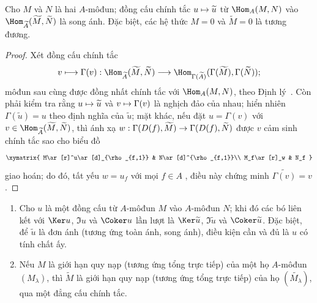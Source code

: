 \documentclass[oneside]{amsart}
\makeatletter
\newcommand{\ega@arrow}[2]{\mathchoice{#1}{#2}{#2}{#2}}
\let\ega@shortmapsto\mapsto
\renewcommand{\to}{\ega@arrow{\longrightarrow}{\rightarrow}}
\renewcommand{\mapsto}{\ega@arrow{\longmapsto}{\ega@shortmapsto}}
\let\EGAOriginalLabel\label
\renewcommand{\label}[1]{\phantomsection\EGAOriginalLabel{#1}}
\makeatother
\begin{document}
\begin{corollary}[1.3.8]
\label{I.1.3.8}
Cho $M$ và $N$ là hai $A$-môđun;
đồng cấu chính tắc $u\mapsto\widetilde{u}$ từ $\Hom_A(M,N)$ vào $\Hom_{\widetilde{A}}(\widetilde{M},\widetilde{N})$ là song ánh.
Đặc biệt, các hệ thức $M=0$ và $\widetilde{M}=0$ là tương đương.
\end{corollary}

\begin{proof}
Xét đồng cấu chính tắc
\[
  v\longmapsto\Gamma(v):
  \Hom_{\widetilde{A}}(\widetilde{M},\widetilde{N})
  \longrightarrow
  \Hom_{\Gamma(\widetilde{A})}(\Gamma(\widetilde{M}),\Gamma(\widetilde{N}));
\]
môđun sau cùng được đồng nhất chính tắc với $\Hom_A(M,N)$, theo Định lý~.
Còn phải kiểm tra rằng $u\mapsto\widetilde{u}$ và $v\mapsto\Gamma(v)$ là nghịch đảo của nhau;
hiển nhiên $\Gamma(\widetilde{u})=u$ theo định nghĩa của $\widetilde{u}$;
mặt khác, nếu đặt $u=\Gamma(v)$ với $v\in\Hom_{\widetilde{A}}(\widetilde{M},\widetilde{N})$, thì ánh xạ $w:\Gamma(D(f),\widetilde{M})\to\Gamma(D(f),\widetilde{N})$ được $v$ cảm sinh chính tắc sao cho biểu đồ
\[
  \xymatrix{
    M\ar[r]^u\ar[d]_{\rho_{f,1}} & N\ar[d]^{\rho_{f,1}}\\
    M_f\ar[r]_w & N_f
  }
\]
giao hoán;
do đó, tất yếu $w=u_f$ với mọi $f\in A$ , điều này chứng minh $\widetilde{\Gamma(v)}=v$.
\end{proof}

\begin{corollary}[1.3.9]
\label{I.1.3.9}
\medskip\noindent
\begin{enumerate}
  \item[{\rm(i)}] Cho $u$ là một đồng cấu từ $A$-môđun $M$ vào $A$-môđun $N$;
    khi đó các bó liên kết với $\Ker u$, $\Im u$ và $\Coker u$ lần lượt là $\Ker\widetilde{u}$, $\Im\widetilde{u}$ và $\Coker\widetilde{u}$.
    Đặc biệt, để $\widetilde{u}$ là đơn ánh (tương ứng toàn ánh, song ánh), điều kiện cần và đủ là $u$ có tính chất ấy.
  \item[{\rm(ii)}] Nếu $M$ là giới hạn quy nạp (tương ứng tổng trực tiếp) của một họ $A$-môđun $(M_\lambda)$, thì $\widetilde{M}$ là giới hạn quy nạp (tương ứng tổng trực tiếp) của họ $(\widetilde{M_\lambda})$, qua một đẳng cấu chính tắc.
\end{enumerate}
\end{corollary}
\end{document}

